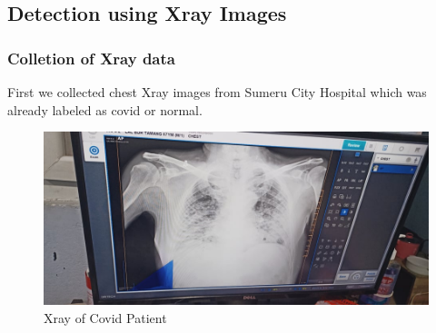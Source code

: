 \documentclass[a4paper,12pt]{report}
\begin{document}
  \pagebreak
    \subsection{Detection using Xray Images}
\subsubsection{Colletion of Xray data}
First we collected chest Xray images from Sumeru City Hospital which was already labeled as covid or normal.
\begin{figure}[h] %
   \begin{center}
   \includegraphics[scale=0.2]{xray1.jpg}
   \caption{Xray of Covid Patient}
  \end{center}
  \end{figure}
\end{document}
